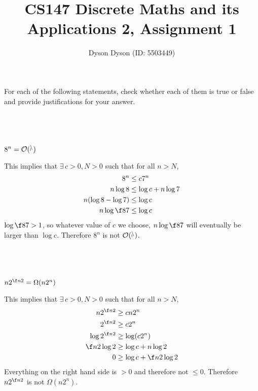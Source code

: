 \documentclass[a4paper]{article}
\title{CS147 Discrete Maths and its Applications 2, Assignment 1}
\author{Dyson Dyson (ID: 5503449)}
\begin{document}
\maketitle

\setlength{\parindent}{0em}
\setlength{\parskip}{1em}


\begin{questionbody}
For each of the following statements, check whether each of them is true or false and provide justifications for your answer.
\end{questionbody}

\subsection{~} %

\begin{questionbody}
$8^n = \cal O(7^n)$
\end{questionbody}

This implies that $\exists\, c > 0, N > 0$ such that for all $n > N$, \begin{align*}
8^n &\le c 7^n\\
n \log 8 &\le \log c + n \log 7\\
n (\log 8 - \log 7) &\le \log c\\
n \log \f87 &\le \log c
\end{align*}
$\log \f87 > 1$, so whatever value of $c$ we choose, $n \log \f87$ will eventually be larger than $\log c$. Therefore $8^n$ is not $\cal O(7^n)$.

\subsection{~} %

\begin{questionbody}
$n 2^{\f n2} = \Omega(n 2^n)$
\end{questionbody}

This implies that $\exists\, c > 0, N > 0$ such that for all $n > N$, \begin{align*}
n 2^{\f n2} &\ge c n 2^n\\
2^{\f n2} &\ge c 2^n\\
\log 2^{\f n2} &\ge \log (c 2^n)\\
\f n2 \log 2 &\ge \log c + n \log 2\\
0 &\ge \log c + \f n2 \log 2
\end{align*}
Everything on the right hand side is $>0$ and therefore not $\le 0$. Therefore $n 2^{\f n2}$ is not $\Omega(n 2^n)$.
\end{document}
